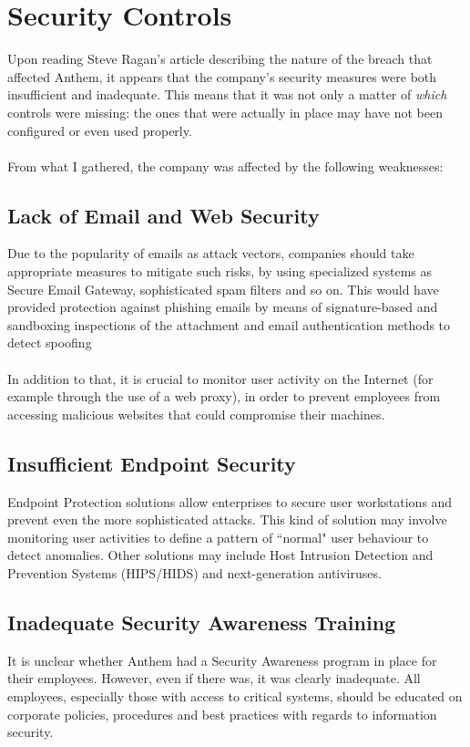 \section{Security Controls}
	Upon reading Steve Ragan's article \cite{breacharticle} describing the nature of the breach that affected Anthem, it appears that the company's security measures were both insufficient and inadequate. This means that it was not only a matter of \textit{which} controls were missing: the ones that were actually in place may have not been configured or even used properly.\\\\
	From what I gathered, the company was affected by the following weaknesses: 
	\subsection{Lack of Email and Web Security}
	Due to the popularity of emails as attack vectors, companies should take appropriate measures to mitigate such risks, by using specialized systems as Secure Email Gateway, sophisticated spam filters and so on. This would have provided protection against phishing emails by means of signature-based and sandboxing inspections of the attachment and email authentication methods to detect spoofing\\\\In addition to that, it is crucial to monitor user activity on the Internet (for example through the use of a web proxy), in order to prevent employees from accessing malicious websites that could compromise their machines.
	\subsection{Insufficient Endpoint Security}
	Endpoint Protection solutions allow enterprises to secure user workstations and prevent even the more sophisticated attacks. This kind of solution may involve monitoring user activities to define a pattern of ``normal" user behaviour to detect anomalies. Other solutions may include Host Intrusion Detection and Prevention Systems (HIPS/HIDS) and next-generation antiviruses.
	\subsection{Inadequate Security Awareness Training}
	It is unclear whether Anthem had a Security Awareness program in place for their employees. However, even if there was, it was clearly inadequate. All employees, especially those with access to critical systems, should be educated on corporate policies, procedures and best practices with regards to information security.
